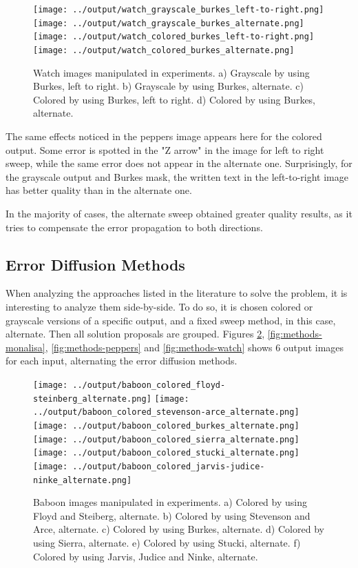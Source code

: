 \documentclass[]{IEEEtran}
\begin{document}
\begin{figure}[H]
  \centering
  \texttt{[image: ../output/watch\_grayscale\_burkes\_left-to-right.png]}
  \texttt{[image: ../output/watch\_grayscale\_burkes\_alternate.png]}
  \texttt{[image: ../output/watch\_colored\_burkes\_left-to-right.png]}
  \texttt{[image: ../output/watch\_colored\_burkes\_alternate.png]}
  \caption{Watch images manipulated in experiments. a) Grayscale by using Burkes, left to right. b) Grayscale by using Burkes, alternate. c) Colored by using Burkes, left to right. d) Colored by using Burkes, alternate.}
  \label{fig:sweep-watch}
\end{figure}

The same effects noticed in the peppers image appears here for the colored output. Some error is spotted in the "Z arrow" in the image for left to right sweep, while the same error does not appear in the alternate one. Surprisingly, for the grayscale output and Burkes mask, the written text in the left-to-right image has better quality than in the alternate one.

In the majority of cases, the alternate sweep obtained greater quality results, as it tries to compensate the error propagation to both directions.

\subsection{Error Diffusion Methods}
When analyzing the approaches listed in the literature to solve the problem, it is interesting to analyze them side-by-side. To do so, it is chosen colored or grayscale versions of a specific output, and a fixed sweep method, in this case, alternate. Then all solution proposals are grouped. Figures \ref{fig:methods-baboon}, \ref{fig:methods-monalisa}, \ref{fig:methods-peppers} and \ref{fig:methods-watch} shows 6 output images for each input, alternating the error diffusion methods.

\begin{figure}[H]
  \centering
  \texttt{[image: ../output/baboon\_colored\_floyd-steinberg\_alternate.png]}
  \texttt{[image: ../output/baboon\_colored\_stevenson-arce\_alternate.png]}
  \texttt{[image: ../output/baboon\_colored\_burkes\_alternate.png]}
  \texttt{[image: ../output/baboon\_colored\_sierra\_alternate.png]}
  \texttt{[image: ../output/baboon\_colored\_stucki\_alternate.png]}
  \texttt{[image: ../output/baboon\_colored\_jarvis-judice-ninke\_alternate.png]}
  \caption{Baboon images manipulated in experiments. a) Colored by using Floyd and Steiberg, alternate. b) Colored by using Stevenson and Arce, alternate. c) Colored by using Burkes, alternate. d) Colored by using Sierra, alternate. e) Colored by using Stucki, alternate. f) Colored by using Jarvis, Judice and Ninke, alternate. }
  \label{fig:methods-baboon}
\end{figure}
\end{document}
